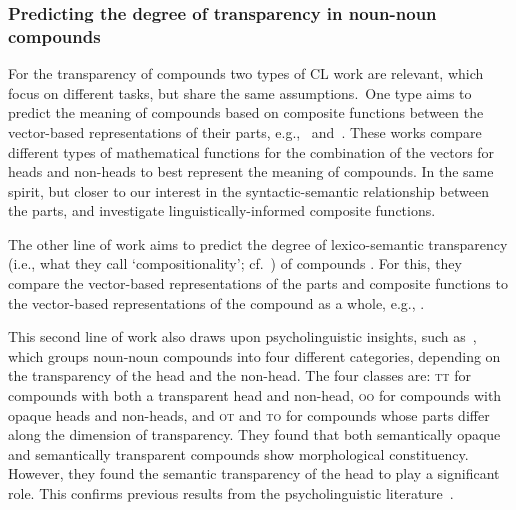 \documentclass[output=paper]{langsci/langscibook}
\begin{document}
\subsubsection{Predicting  {the degree of transparency in noun-noun} compounds}\label{sec:NLP:lit:compositional}
For the transparency of  compounds two types of CL work are relevant,  {which} focus on different tasks, but share the same assumptions.\ One type  aims to predict the meaning of compounds based on composite functions between the vector-based representations of their parts, e.g.,~\cite{OSeaghdha:2008} and~\cite{Mitchell:2010}.
These works  compare different types of mathematical functions for the combination of the vectors for heads and non-heads to best represent the  meaning of compounds.  {In the same spirit, but closer to our interest in the syntactic-semantic relationship between the parts, \cite{marelli:baroni:15} and \cite{baroni:zamparelli:10} investigate linguistically-informed composite functions.}

The other line of work aims to predict the degree of  {lexico-semantic transparency}  {(i.e., what they call \lq compositionality\rq; cf.~)} of compounds {. For this, they compare} the vector-based representations of the parts and composite functions  {to} the vector-based representations of the compound as a whole, e.g., \cite{SchulteImWaldeEtAl:16,Reddy:2011}. 

This  second line of work also draws upon psycholinguistic insights,  such as~\citet{Libben:1997,Libben:2003}, which groups noun-noun compounds into four different categories, depending on the transparency of the head and the non-head.
The four classes are:
 {\textsc{tt}} for compounds with both a transparent head and non-head,
 {\textsc{oo}} for compounds with opaque heads and non-heads,
and  {\textsc{ot}} and  {\textsc{to}} for compounds whose parts differ along the dimension of transparency. They found that both semantically opaque and semantically transparent compounds show morphological constituency. However, they found the semantic transparency of the head to play a significant role. This confirms previous results from the psycholinguistic literature~\citep{Zwitserlood:1994}. 
\end{document}
